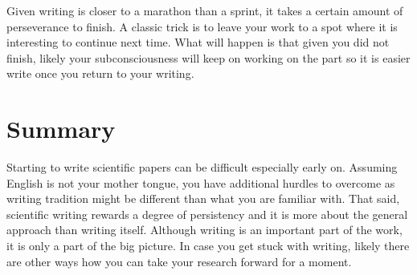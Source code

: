 Given writing is closer to a marathon than a sprint, it takes a certain amount of perseverance to finish.
A classic trick is to leave your work to a spot where it is interesting to continue next time.
What will happen is that given you did not finish, likely your subconsciousness will keep on working on the part so it is easier write once you return to your writing.

\section{Summary}

Starting to write scientific papers can be difficult especially early on.
Assuming English is not your mother tongue, you have additional hurdles to overcome as writing tradition might be different than what you are familiar with. 
That said, scientific writing rewards a degree of persistency and it is more about the general approach than writing itself.
Although writing is an important part of the work, it is only a part of the big picture.
In case you get stuck with writing, likely there are other ways how you can take your research forward for a moment.
